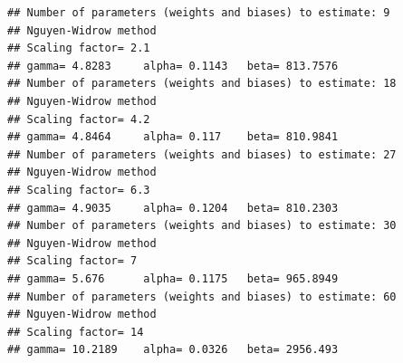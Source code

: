 \documentclass[
]{article}
\newenvironment{Shaded}{\begin{snugshade}}{\end{snugshade}}
\newcommand{\AttributeTok}[1]{\textcolor[rgb]{0.77,0.63,0.00}{#1}}
\newcommand{\CommentTok}[1]{\textcolor[rgb]{0.56,0.35,0.01}{\textit{#1}}}
\newcommand{\ConstantTok}[1]{\textcolor[rgb]{0.00,0.00,0.00}{#1}}
\newcommand{\ControlFlowTok}[1]{\textcolor[rgb]{0.13,0.29,0.53}{\textbf{#1}}}
\newcommand{\DecValTok}[1]{\textcolor[rgb]{0.00,0.00,0.81}{#1}}
\newcommand{\FunctionTok}[1]{\textcolor[rgb]{0.00,0.00,0.00}{#1}}
\newcommand{\NormalTok}[1]{#1}
\newcommand{\OtherTok}[1]{\textcolor[rgb]{0.56,0.35,0.01}{#1}}
\newcommand{\SpecialCharTok}[1]{\textcolor[rgb]{0.00,0.00,0.00}{#1}}
\newcommand{\StringTok}[1]{\textcolor[rgb]{0.31,0.60,0.02}{#1}}
\begin{document}
\begin{Shaded}
\end{Shaded}

\begin{verbatim}
## Number of parameters (weights and biases) to estimate: 9 
## Nguyen-Widrow method
## Scaling factor= 2.1 
## gamma= 4.8283     alpha= 0.1143   beta= 813.7576 
## Number of parameters (weights and biases) to estimate: 18 
## Nguyen-Widrow method
## Scaling factor= 4.2 
## gamma= 4.8464     alpha= 0.117    beta= 810.9841 
## Number of parameters (weights and biases) to estimate: 27 
## Nguyen-Widrow method
## Scaling factor= 6.3 
## gamma= 4.9035     alpha= 0.1204   beta= 810.2303 
## Number of parameters (weights and biases) to estimate: 30 
## Nguyen-Widrow method
## Scaling factor= 7 
## gamma= 5.676      alpha= 0.1175   beta= 965.8949 
## Number of parameters (weights and biases) to estimate: 60 
## Nguyen-Widrow method
## Scaling factor= 14 
## gamma= 10.2189    alpha= 0.0326   beta= 2956.493
\end{verbatim}
\end{document}
